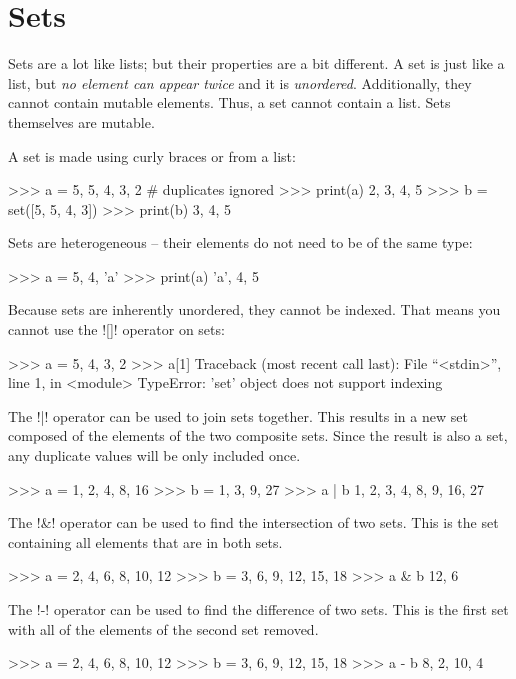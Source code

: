 \documentclass[11pt]{cselabheader}
\begin{document}
\pagebreak

\tableofcontents

\pagebreak

\section{Sets}
Sets are a lot like lists; but their properties are a bit different.
A set is just like a list, but \emph{no element can appear twice} and it is
\emph{unordered}. Additionally, they cannot contain mutable elements. Thus,
a set cannot contain a list. Sets themselves are mutable.

A set is made using curly braces or from a list:
\begin{pyconcode}
>>> a = {5, 5, 4, 3, 2} # duplicates ignored
>>> print(a)
{2, 3, 4, 5}
>>> b = set([5, 5, 4, 3])
>>> print(b)
{3, 4, 5}
\end{pyconcode}

Sets are heterogeneous -- their elements do not need to be of the same type:
\begin{pyconcode}
>>> a = {5, 4, 'a'}
>>> print(a)
{'a', 4, 5}
\end{pyconcode}

Because sets are inherently unordered, they cannot be indexed. That means you
cannot use the \pythoninline![]! operator on sets:
\begin{pyconcode}
>>> a = {5, 4, 3, 2}
>>> a[1]
Traceback (most recent call last):
  File ``<stdin>'', line 1, in <module>
  TypeError: 'set' object does not support indexing
\end{pyconcode}


The \pythoninline!|! operator can be used to join sets together. This results
in a new set composed of the elements of the two composite sets.
Since the result is also a set, any duplicate values will be only included once.
\begin{pyconcode}
>>> a = {1, 2, 4, 8, 16}
>>> b = {1, 3, 9, 27}
>>> a | b
{1, 2, 3, 4, 8, 9, 16, 27}
\end{pyconcode}


The \pythoninline!&! operator can be used to find the intersection of two sets.
This is the set containing all elements that are in both sets.
\begin{pyconcode}
>>> a = {2, 4, 6, 8, 10, 12}
>>> b = {3, 6, 9, 12, 15, 18}
>>> a & b
{12, 6}
\end{pyconcode}


The \pythoninline!-! operator can be used to find the difference of two sets.
This is the first set with all of the elements of the second set removed.
\begin{pyconcode}
>>> a = {2, 4, 6, 8, 10, 12}
>>> b = {3, 6, 9, 12, 15, 18}
>>> a - b
{8, 2, 10, 4}
\end{pyconcode}
\end{document}

